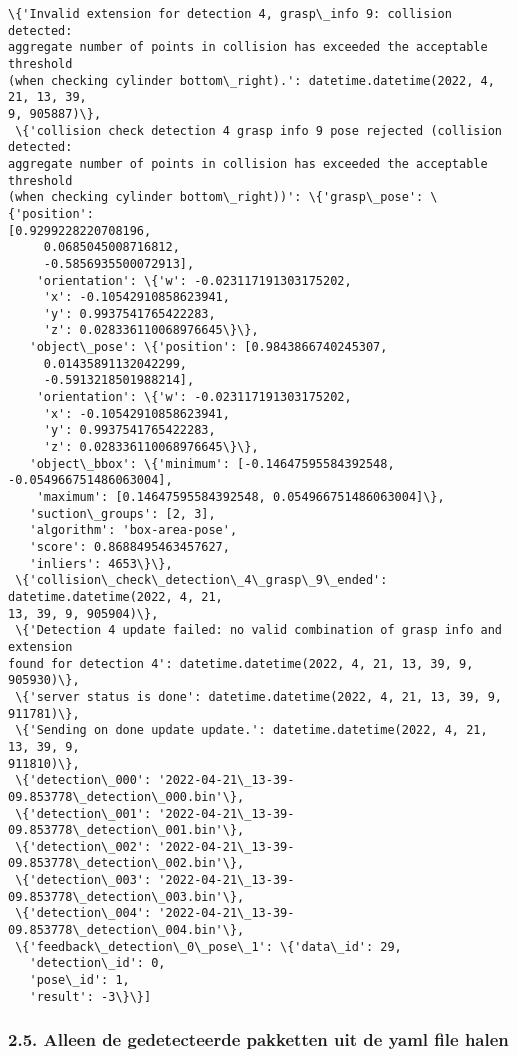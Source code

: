 \documentclass[11pt]{article}
\begin{document}
\begin{tcolorbox}[breakable, size=fbox, boxrule=.5pt, pad at break*=1mm, opacityfill=0]
\begin{Verbatim}[commandchars=\\\{\}]
 \{'Invalid extension for detection 4, grasp\_info 9: collision detected:
aggregate number of points in collision has exceeded the acceptable threshold
(when checking cylinder bottom\_right).': datetime.datetime(2022, 4, 21, 13, 39,
9, 905887)\},
 \{'collision check detection 4 grasp info 9 pose rejected (collision detected:
aggregate number of points in collision has exceeded the acceptable threshold
(when checking cylinder bottom\_right))': \{'grasp\_pose': \{'position':
[0.9299228220708196,
     0.0685045008716812,
     -0.5856935500072913],
    'orientation': \{'w': -0.023117191303175202,
     'x': -0.10542910858623941,
     'y': 0.9937541765422283,
     'z': 0.028336110068976645\}\},
   'object\_pose': \{'position': [0.9843866740245307,
     0.01435891132042299,
     -0.5913218501988214],
    'orientation': \{'w': -0.023117191303175202,
     'x': -0.10542910858623941,
     'y': 0.9937541765422283,
     'z': 0.028336110068976645\}\},
   'object\_bbox': \{'minimum': [-0.14647595584392548, -0.054966751486063004],
    'maximum': [0.14647595584392548, 0.054966751486063004]\},
   'suction\_groups': [2, 3],
   'algorithm': 'box-area-pose',
   'score': 0.8688495463457627,
   'inliers': 4653\}\},
 \{'collision\_check\_detection\_4\_grasp\_9\_ended': datetime.datetime(2022, 4, 21,
13, 39, 9, 905904)\},
 \{'Detection 4 update failed: no valid combination of grasp info and extension
found for detection 4': datetime.datetime(2022, 4, 21, 13, 39, 9, 905930)\},
 \{'server status is done': datetime.datetime(2022, 4, 21, 13, 39, 9, 911781)\},
 \{'Sending on done update update.': datetime.datetime(2022, 4, 21, 13, 39, 9,
911810)\},
 \{'detection\_000': '2022-04-21\_13-39-09.853778\_detection\_000.bin'\},
 \{'detection\_001': '2022-04-21\_13-39-09.853778\_detection\_001.bin'\},
 \{'detection\_002': '2022-04-21\_13-39-09.853778\_detection\_002.bin'\},
 \{'detection\_003': '2022-04-21\_13-39-09.853778\_detection\_003.bin'\},
 \{'detection\_004': '2022-04-21\_13-39-09.853778\_detection\_004.bin'\},
 \{'feedback\_detection\_0\_pose\_1': \{'data\_id': 29,
   'detection\_id': 0,
   'pose\_id': 1,
   'result': -3\}\}]
\end{Verbatim}
\end{tcolorbox}
        
    \subsubsection{2.5. Alleen de gedetecteerde pakketten uit de yaml file
halen}\label{alleen-de-gedetecteerde-pakketten-uit-de-yaml-file-halen}
\end{document}
